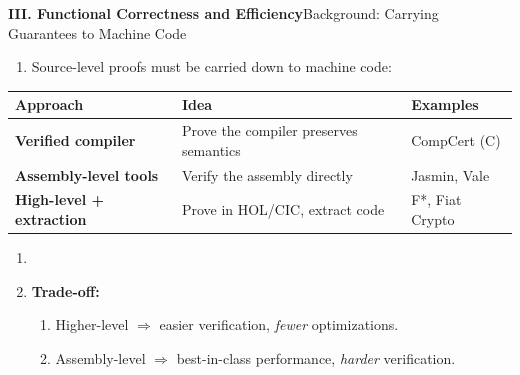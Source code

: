 \documentclass[10pt,aspectratio=1610,compress,dvipsnames]{beamer}
\begin{document}
\begin{frame}[fragile]{\bfseries III. Functional Correctness and Efficiency}{Background: Carrying Guarantees to Machine Code}
\begin{enumerate}[$\bullet$]
	\item Source-level proofs must be carried down to machine code:
\end{enumerate}
\begin{center}
\renewcommand{\arraystretch}{1.4}
\begin{tabular}{l|l|l}
\toprule[1.2pt]
\textbf{Approach} & \textbf{Idea} & \textbf{Examples} \\
\midrule
\textbf{Verified compiler} & Prove the compiler preserves semantics & CompCert (C) \\
\hline
\textbf{Assembly-level tools} & Verify the assembly directly & Jasmin, Vale \\
\hline
\textbf{High-level + extraction} & Prove in HOL/CIC, extract code & F*, Fiat Crypto \\
\bottomrule[1.2pt]
\end{tabular}
\end{center}
\begin{enumerate}[$\bullet$]
	\item[]
	\item {\bfseries\color{cseblue}Trade-off:}
	\begin{enumerate}[$\to$]
		\item Higher-level $\Rightarrow$ easier verification, \emph{fewer} optimizations.
		\item Assembly-level $\Rightarrow$ best-in-class performance, \emph{harder} verification.
	\end{enumerate}
\end{enumerate}
\end{frame}
\end{document}
